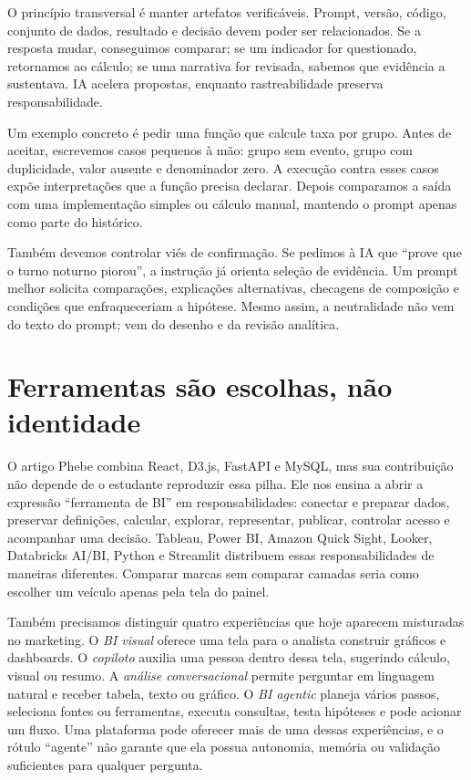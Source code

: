 O princípio transversal é manter artefatos verificáveis. Prompt, versão, código, conjunto de dados, resultado e decisão devem poder ser relacionados. Se a resposta mudar, conseguimos comparar; se um indicador for questionado, retornamos ao cálculo; se uma narrativa for revisada, sabemos que evidência a sustentava. IA acelera propostas, enquanto rastreabilidade preserva responsabilidade.

Um exemplo concreto é pedir uma função que calcule taxa por grupo. Antes de aceitar, escrevemos casos pequenos à mão: grupo sem evento, grupo com duplicidade, valor ausente e denominador zero. A execução contra esses casos expõe interpretações que a função precisa declarar. Depois comparamos a saída com uma implementação simples ou cálculo manual, mantendo o prompt apenas como parte do histórico.

Também devemos controlar viés de confirmação. Se pedimos à IA que ``prove que o turno noturno piorou'', a instrução já orienta seleção de evidência. Um prompt melhor solicita comparações, explicações alternativas, checagens de composição e condições que enfraqueceriam a hipótese. Mesmo assim, a neutralidade não vem do texto do prompt; vem do desenho e da revisão analítica.

\section{Ferramentas são escolhas, não identidade}

O artigo Phebe combina React, D3.js, FastAPI e MySQL, mas sua contribuição não depende de o estudante reproduzir essa pilha. Ele nos ensina a abrir a expressão ``ferramenta de BI'' em responsabilidades: conectar e preparar dados, preservar definições, calcular, explorar, representar, publicar, controlar acesso e acompanhar uma decisão. Tableau, Power BI, Amazon Quick Sight, Looker, Databricks AI/BI, Python e Streamlit distribuem essas responsabilidades de maneiras diferentes. Comparar marcas sem comparar camadas seria como escolher um veículo apenas pela tela do painel.

Também precisamos distinguir quatro experiências que hoje aparecem misturadas no marketing. O \textit{BI visual} oferece uma tela para o analista construir gráficos e dashboards. O \textit{copiloto} auxilia uma pessoa dentro dessa tela, sugerindo cálculo, visual ou resumo. A \textit{análise conversacional} permite perguntar em linguagem natural e receber tabela, texto ou gráfico. O \textit{BI agentic} planeja vários passos, seleciona fontes ou ferramentas, executa consultas, testa hipóteses e pode acionar um fluxo. Uma plataforma pode oferecer mais de uma dessas experiências, e o rótulo ``agente'' não garante que ela possua autonomia, memória ou validação suficientes para qualquer pergunta.

